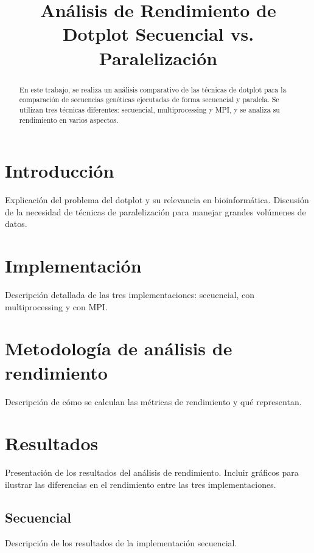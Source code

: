 \documentclass[conference]{IEEEtran}
\begin{document}
\title{Análisis de Rendimiento de Dotplot Secuencial vs. Paralelización}

\author{
}

\maketitle

\begin{abstract}
En este trabajo, se realiza un análisis comparativo de las técnicas de dotplot para la comparación de secuencias genéticas ejecutadas de forma secuencial y paralela. Se utilizan tres técnicas diferentes: secuencial, multiprocessing y MPI, y se analiza su rendimiento en varios aspectos.
\end{abstract}

\section{Introducción}
Explicación del problema del dotplot y su relevancia en bioinformática. Discusión de la necesidad de técnicas de paralelización para manejar grandes volúmenes de datos.

\section{Implementación}
Descripción detallada de las tres implementaciones: secuencial, con multiprocessing y con MPI.

\section{Metodología de análisis de rendimiento}
Descripción de cómo se calculan las métricas de rendimiento y qué representan.

\section{Resultados}
Presentación de los resultados del análisis de rendimiento. Incluir gráficos para ilustrar las diferencias en el rendimiento entre las tres implementaciones.

\subsection{Secuencial}
Descripción de los resultados de la implementación secuencial.
\end{document}
